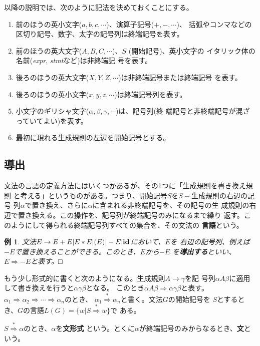 \documentclass[a4j,11pt]{jsarticle}
\newtheorem{example}{例}
\begin{document}
以降の説明では、次のように記法を決めておくことにする。
\begin{enumerate}
 \item 前のほうの英小文字($a, b, c, \cdots$)、演算子記号($+, -, \cdots$)、
       括弧やコンマなどの区切り記号、数字、太字の記号列は終端記号を表す。
 \item 前のほうの英大文字($A, B, C, \cdots$)、$S$ (開始記号)、英小文字の
       イタリック体の名前({\itshape expr}, {\itshape stmt}など)は非終端記
       号を表す。
 \item 後ろのほうの英大文字($X, Y, Z, \cdots$)は非終端記号または終端記号
       を表す。
 \item 後ろのほうの英小文字($x, y, z, \cdots$)は終端記号列を表す。
 \item 小文字のギリシャ文字($\alpha, \beta, \gamma, \cdots$)は、記号列(終
       端記号と非終端記号が混ざっていてよい)を表す。
 \item 最初に現れる生成規則の左辺を開始記号とする。
\end{enumerate}

\subsection{導出}

文法の言語の定義方法にはいくつかあるが、その1つに「生成規則を書き換え規則
と考える」というものがある。つまり、開始記号$S$を$S-$生成規則の右辺の記号
列$\alpha$で置き換え、さらに$\alpha$に含まれる非終端記号を、その記号の生
成規則の右辺で置き換える。この操作を、記号列が終端記号のみになるまで繰り
返す。このようにして得られる終端記号列すべての集合を、その文法の
{\bfseries 言語}という。

\begin{example}\label{ex:derive}
 文法$E \rightarrow E + E | E * E | (E) | -E | {\bf id}$において、$E$を
 右辺の記号列、例えば$-E$で置き換えることができる。このとき、$E$から$-E$
 を{\bfseries 導出する}といい、$E \Rightarrow -E$と表す。□
\end{example}

もう少し形式的に書くと次のようになる。生成規則$A \rightarrow \gamma$を記
号列$\alpha A\beta$に適用して書き換えを行うと$\alpha\gamma\beta$となる。
このとき$\alpha A\beta \Rightarrow \alpha\gamma\beta$と表す。$\alpha_1
\Rightarrow \alpha_2 \Rightarrow \cdots \Rightarrow \alpha_n$のとき、
$\alpha_1 \stackrel{*}{\Rightarrow} \alpha_n$と書く。文法$G$の開始記号を
$S$とするとき、$G$の言語$L(G) = \{w | S \stackrel{*}{\Rightarrow} w\}$で
ある。

$S \stackrel{*}{\Rightarrow} \alpha$のとき、$\alpha$を{\bfseries 文形式}
という。とくに$\alpha$が終端記号のみからなるとき、{\bfseries 文}という。
\end{document}
